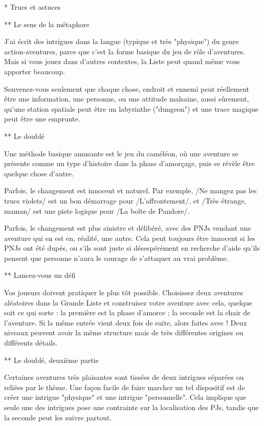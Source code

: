 \begin{enumerate}
* Trucs et astuces

** Le sens de la métaphore

J'ai écrit des intrigues dans la langue (typique et très "physique") du genre action-aventures, parce que c'est la forme basique du jeu de rôle d'aventures. Mais si vous jouez dans d'autres contextes, la Liste peut quand même vous apporter beaucoup.

Souvenez-vous seulement que chaque chose, endroit et ennemi peut réellement être une information, une personne, ou une attitude malsaine, aussi sûrement, qu'une station spatiale peut être un labyrinthe ("dungeon") et une trace magique peut être une emprunte.

** Le doublé

Une méthode basique amusante est le jeu du caméléon, où une aventure se présente comme un type d'histoire dans la phase d'amorçage, puis se révèle être quelque chose d'autre.

Parfois, le changement est innocent et naturel. Par exemple, /Ne mangez pas les trucs violets/ est un bon démarrage pour /L'affrontement/, et /Très étrange, maman/ est une piste logique pour /La boîte de Pandore/.

Parfois, le changement est plus sinistre et délibéré, avec des PNJs vendant une aventure qui en est en, réalité, une autre. Cela peut toujours être innocent si les PNJs ont été dupés, ou s'ils sont juste si désespérément en recherche d'aide qu'ils pensent que personne n'aura le courage de s'attaquer au vrai problème.

** Lancez-vous un défi

Vos joueurs doivent pratiquer le plus tôt possible. Choisissez deux aventures aléatoires dans la Grande Liste et construisez votre aventure avec cela, quelque soit ce qui sorte : la première est la phase d'amorce ; la seconde est la chair de l'aventure. Si la même entrée vient deux fois de suite, alors faites avec ! Deux niveaux peuvent avoir la même structure mais de très différentes origines ou différents détails.

** Le doublé, deuxième partie

Certaines aventures très plaisantes sont tissées de deux intrigues séparées ou reliées par le thème. Une façon facile de faire marcher un tel dispositif est de créer une intrigue "physique" et une intrigue "personnelle". Cela implique que seule une des intrigues pose une contrainte sur la localisation des PJs, tandis que la seconde peut les suivre partout.


\end{enumerate}
